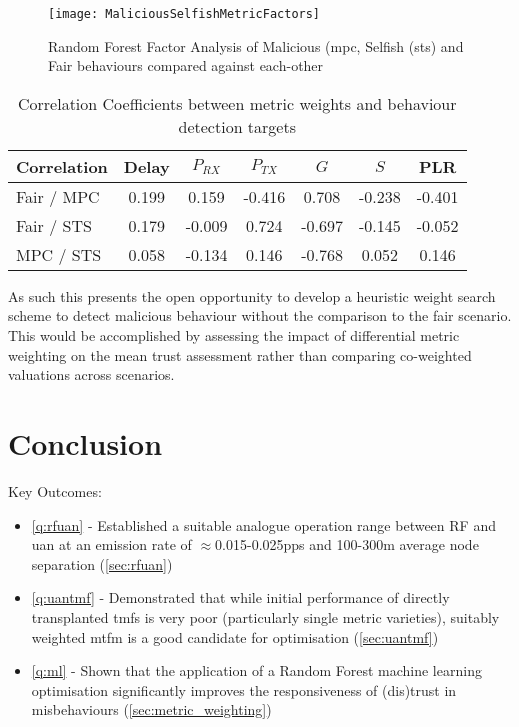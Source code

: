 \begin{figure}
	\centering
	\texttt{[image: MaliciousSelfishMetricFactors]}
	\caption{Random Forest Factor Analysis of Malicious (\gls{mpc}, Selfish (\gls{sts}) and Fair behaviours compared against each-other}
	\label{fig:malselfactors}
\end{figure}

\begin{table}[h]
	\caption{Correlation Coefficients between metric weights and behaviour detection targets} \label{tab:correlations}
	\begin{center}
		\begin{tabular}{lcccccc}
			\toprule
			Correlation      & Delay & $P_{RX}$ & $P_{TX}$ & $G$ & $S$ & PLR \\
			\midrule
			Fair / MPC       & 0.199 &  0.159   & -0.416  &  0.708   & -0.238   & -0.401\\
			Fair / STS       & 0.179 &  -0.009  &  0.724  & -0.697   & -0.145   & -0.052\\
			MPC / STS        & 0.058 &  -0.134  &  0.146  & -0.768   &  0.052   &  0.146\\
			\bottomrule
		\end{tabular}
	\end{center}
\end{table}

As such this presents the open opportunity to develop a heuristic weight search scheme to detect malicious behaviour without the comparison to the fair scenario.
This would be accomplished by assessing the impact of differential metric weighting on the mean trust assessment rather than comparing co-weighted valuations across scenarios.

\section{Conclusion}

Key Outcomes: 
\begin{itemize}
	\item \autoref{q:rfuan} - Established a suitable analogue operation range between RF and \gls{uan} at an emission rate of $\approx$0.015-0.025pps and 100-300m average node separation (\autoref{sec:rfuan})
	\item \autoref{q:uantmf} - Demonstrated that while initial performance of directly transplanted \glspl{tmf} is very poor (particularly single metric varieties), suitably weighted \gls{mtfm} is a good candidate for optimisation (\ref{sec:uantmf})
	\item \autoref{q:ml} - Shown that the application of a Random Forest machine learning optimisation significantly improves the responsiveness of (dis)trust in misbehaviours (\autoref{sec:metric_weighting})
\end{itemize}

